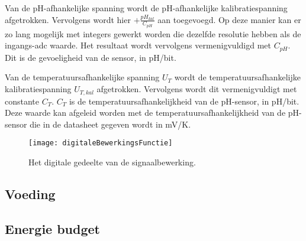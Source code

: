 Van de pH-afhankelijke spanning wordt de pH-afhankelijke kalibratiespanning afgetrokken. Vervolgens wordt hier $+\frac{pH_{kal}}{C_{pH}}$ aan toegevoegd. Op deze manier kan er zo lang mogelijk met integers gewerkt worden die dezelfde resolutie hebben als de ingangs-adc waarde. Het resultaat wordt vervolgens vermenigvuldigd met $C_{pH}$. Dit is de gevoeligheid van de sensor, in pH/bit.

Van de temperatuursafhankelijke spanning $U_T$ wordt de temperatuursafhankelijke kalibratiespanning $U_{T,kal}$ afgetrokken. Vervolgens wordt dit vermenigvuldigt met constante $C_T$. $C_T$ is de temperatuursafhankelijkheid van de pH-sensor, in pH/bit. Deze waarde kan afgeleid worden met de temperatuursafhankelijkheid van de pH-sensor die in de datasheet gegeven wordt in mV/K.

\begin{figure}[ht]
    \centering
    \texttt{[image: digitaleBewerkingsFunctie]}
    \caption{Het digitale gedeelte van de signaalbewerking.} 
    \label{fig:digitaleBewerkingsFunctie}
\end{figure}








\subsection{Voeding} \label{sec:voeding}
\subsection{Energie budget}




%
